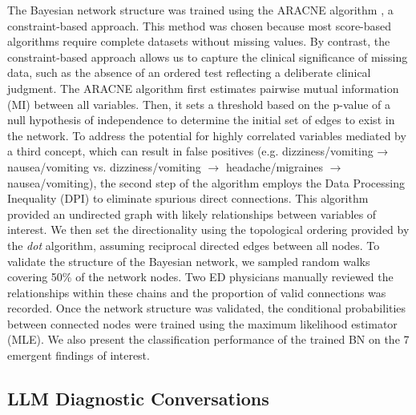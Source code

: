 The Bayesian network structure was trained using the ARACNE algorithm \citep{margolinARACNEAlgorithmReconstruction2006}, a constraint-based approach. This method was chosen because most score-based algorithms require complete datasets without missing values. By contrast, the constraint-based approach allows us to capture the clinical significance of missing data, such as the absence of an ordered test reflecting a deliberate clinical judgment. The ARACNE algorithm first estimates pairwise mutual information (MI) between all variables. Then, it sets a threshold based on the p-value of a null hypothesis of independence to determine the initial set of edges to exist in the network. To address the potential for highly correlated variables mediated by a third concept, which can result in false positives (e.g. dizziness/vomiting → nausea/vomiting vs. dizziness/vomiting $\rightarrow$ headache/migraines $\rightarrow$ nausea/vomiting), the second step of the algorithm employs the Data Processing Inequality (DPI) to eliminate spurious direct connections. This algorithm provided an undirected graph with likely relationships between variables of interest. We then set the directionality using the topological ordering provided by the \emph{dot} algorithm, assuming reciprocal directed edges between all nodes. To validate the structure of the Bayesian network, we sampled random walks covering 50\% of the network nodes. Two ED physicians manually reviewed the relationships within these chains and the proportion of valid connections was recorded. Once the network structure was validated, the conditional probabilities between connected nodes were trained using the maximum likelihood estimator (MLE). We also present the classification performance of the trained BN on the 7 emergent findings of interest. 

\subsection{LLM Diagnostic Conversations}

